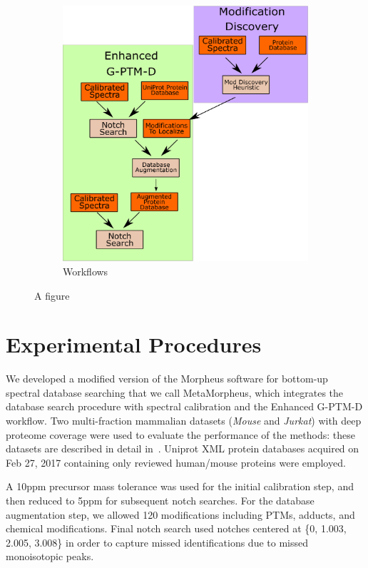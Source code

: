 \documentclass[journal=jprobs,manuscript=article]{achemso}
\begin{document}
\begin{figure}
\begin{subfigure}[b]{.5\linewidth}
  \includegraphics[scale=0.5]{diagram.eps}
  \caption{Workflows}
  \label{fgr:diagram}
\end{subfigure}
\caption{A figure}\label{fig:1}
\end{figure}



\section{Experimental Procedures}
We developed a modified version of the Morpheus software for bottom-up spectral database searching\cite{Wenger_2013} that we call MetaMorpheus, which integrates the database search procedure with spectral calibration and the Enhanced G-PTM-D workflow.
Two multi-fraction mammalian datasets (\textit{Mouse} and \textit{Jurkat}) with deep proteome coverage were used to evaluate the performance of the methods: these datasets are described in detail in~\cite{Shortreed_2015, Cesnik_2016}.
Uniprot XML protein databases acquired on Feb 27, 2017 containing only reviewed human/mouse proteins were employed. 

A 10ppm precursor mass tolerance was used for the initial calibration step, and then reduced to 5ppm for subsequent notch searches.
For the database augmentation step, we allowed 120 modifications including PTMs, adducts, and chemical modifications.
Final notch search used notches centered at \{0, 1.003, 2.005, 3.008\} in order to capture missed identifications due to missed monoisotopic peaks.
\end{document}
